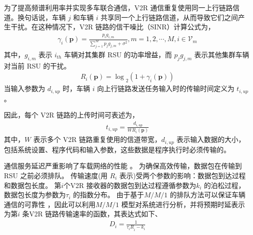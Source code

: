 为了提高频谱利用率并实现多车联合通信，V2R 通信重复使用同一上行链路信道。换句话说，车辆 $j$ 和车辆 $i$ 共享同一个上行链路信道，从而导致它们之间产生干扰。在这种情况下，V2R 链路的信干噪比（SINR）计算公式为，
\begin{eqnarray}\label{E3}
\gamma_i\left(\mathbf{p}\right)=\frac{p_ig_{i,m}}{{\sum_{j=1}^{M}{p_jg_{j,m}}+\sigma^2}}, m=1,2,\cdots ,M , i\in {{\mathcal{V}}_{m}}
\end{eqnarray}
其中，$g_{i,m}$ 表示 $i_{th}$ 车辆对其集群 RSU 的功率增益，而 ${p_jg_{j,m}}$ 表示其他集群车辆对当前 RSU 的干扰。
\begin{eqnarray}\label{E4}
{R_i\left(\mathbf{p}\right)=\log}_2{\left(1+ \gamma_i\left(\mathbf{p}\right) \right)}
\end{eqnarray}
当输入参数为 $d_{i,up}$ 时，车辆 $i$ 向上行链路发送任务输入时的传输时间定义为 $t_{i,up}$。

因此，每个 V2R 链路的上传时间可表述为，
\begin{eqnarray}\label{E6}
t_{i,up}=\frac{d_{i,up}}{WR_i\left(\mathbf{p}\right)}
\end{eqnarray}
其中，$W$ 表示多个 V2R 链路重复使用的信道带宽，$d_{i,up}$ 表示输入数据的大小，包括系统设置、程序代码和输入参数，这些数据是程序执行时必须传输的。

通信服务延迟严重影响了车载网络的性能 \supercite{RAI}。 为确保高效传输，数据包在传输到 RSU 之前必须排队。 传输速度(用 $R_i$ 表示)受两个参数的影响：数据包到达过程和数据包长度。  第$i$个V2R 接收器的数据包到达过程遵循参数为$k_i$ 的泊松过程，数据包长度为参数为$\tau_i$ 的指数分布。 由于基于$M/M/1$ 的排队方法可以保证车辆通信的可靠性 \supercite{Guo2019}，因此可以利用$M/M/1$ 模型对系统进行分析，并将预期时延表示为第$i$ 条V2R 链路传输速率的函数，其表达式如下、
\begin{eqnarray}\label{E7}
D_i=\frac{1}{{\tau_iR}_i-k_i}
\end{eqnarray}

